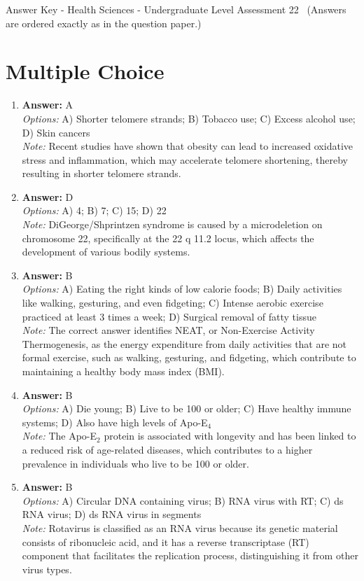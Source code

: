 \documentclass[12pt]{article}
\begin{document}
\begin{center}
Answer Key - Health Sciences - Undergraduate Level Assessment 22 \
\small (Answers are ordered exactly as in the question paper.)
\end{center}

\section*{Multiple Choice}
\begin{enumerate}[label=\arabic*.]
\item \textbf{Answer:} A
\\ \textit{Options:} A) Shorter telomere strands; B) Tobacco use; C) Excess alcohol use; D) Skin cancers
\\ \textit{Note:} Recent studies have shown that obesity can lead to increased oxidative stress and inflammation, which may accelerate telomere shortening, thereby resulting in shorter telomere strands.
\item \textbf{Answer:} D
\\ \textit{Options:} A) 4; B) 7; C) 15; D) 22
\\ \textit{Note:} DiGeorge/Shprintzen syndrome is caused by a microdeletion on chromosome 22, specifically at the 22 q 11.2 locus, which affects the development of various bodily systems.
\item \textbf{Answer:} B
\\ \textit{Options:} A) Eating the right kinds of low calorie foods; B) Daily activities like walking, gesturing, and even fidgeting; C) Intense aerobic exercise practiced at least 3 times a week; D) Surgical removal of fatty tissue
\\ \textit{Note:} The correct answer identifies NEAT, or Non-Exercise Activity Thermogenesis, as the energy expenditure from daily activities that are not formal exercise, such as walking, gesturing, and fidgeting, which contribute to maintaining a healthy body mass index (BMI).
\item \textbf{Answer:} B
\\ \textit{Options:} A) Die young; B) Live to be 100 or older; C) Have healthy immune systems; D) Also have high levels of Apo-E$_{4}$
\\ \textit{Note:} The Apo-E$_{2}$ protein is associated with longevity and has been linked to a reduced risk of age-related diseases, which contributes to a higher prevalence in individuals who live to be 100 or older.
\item \textbf{Answer:} B
\\ \textit{Options:} A) Circular DNA containing virus; B) RNA virus with RT; C) ds RNA virus; D) ds RNA virus in segments
\\ \textit{Note:} Rotavirus is classified as an RNA virus because its genetic material consists of ribonucleic acid, and it has a reverse transcriptase (RT) component that facilitates the replication process, distinguishing it from other virus types.
\end{enumerate}
\end{document}
